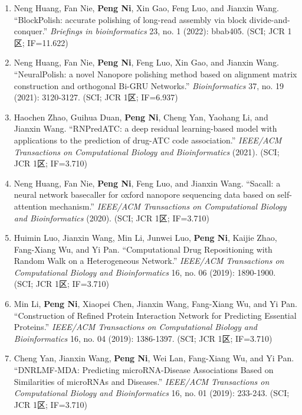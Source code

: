 \documentclass[zh]{resume}
\begin{document}
\begin{itemize}
\begin{enumerate}
    \item Neng Huang, Fan Nie, \textbf{Peng Ni}, Xin Gao, Feng Luo, and Jianxin Wang. \enquote{BlockPolish: accurate polishing of long-read assembly via block divide-and-conquer.} {\it Briefings in bioinformatics} 23, no. 1 (2022): bbab405. (SCI; JCR 1区; IF=11.622)
    \item Neng Huang, Fan Nie, \textbf{Peng Ni}, Feng Luo, Xin Gao, and Jianxin Wang. \enquote{NeuralPolish: a novel Nanopore polishing method based on alignment matrix construction and orthogonal Bi-GRU Networks.} {\it Bioinformatics} 37, no. 19 (2021): 3120-3127. (SCI; JCR 1区; IF=6.937)
    \item Haochen Zhao, Guihua Duan, \textbf{Peng Ni}, Cheng Yan, Yaohang Li, and Jianxin Wang. \enquote{RNPredATC: a deep residual learning-based model with applications to the prediction of drug-ATC code association.} {\it IEEE/ACM Transactions on Computational Biology and Bioinformatics} (2021). (SCI; JCR 1区; IF=3.710)
    \item Neng Huang, Fan Nie, \textbf{Peng Ni}, Feng Luo, and Jianxin Wang. \enquote{Sacall: a neural network basecaller for oxford nanopore sequencing data based on self-attention mechanism.} {\it IEEE/ACM Transactions on Computational Biology and Bioinformatics} (2020). (SCI; JCR 1区; IF=3.710)
    \item Huimin Luo, Jianxin Wang, Min Li, Junwei Luo, \textbf{Peng Ni}, Kaijie Zhao, Fang-Xiang Wu, and Yi Pan. \enquote{Computational Drug Repositioning with Random Walk on a Heterogeneous Network.} {\it IEEE/ACM Transactions on Computational Biology and Bioinformatics} 16, no. 06 (2019): 1890-1900. (SCI; JCR 1区; IF=3.710)
    \item Min Li, \textbf{Peng Ni}, Xiaopei Chen, Jianxin Wang, Fang-Xiang Wu, and Yi Pan. \enquote{Construction of Refined Protein Interaction Network for Predicting Essential Proteins.} {\it IEEE/ACM Transactions on Computational Biology and Bioinformatics} 16, no. 04 (2019): 1386-1397. (SCI; JCR 1区; IF=3.710)
    \item Cheng Yan, Jianxin Wang, \textbf{Peng Ni}, Wei Lan, Fang-Xiang Wu, and Yi Pan. \enquote{DNRLMF-MDA: Predicting microRNA-Disease Associations Based on Similarities of microRNAs and Diseases.} {\it IEEE/ACM Transactions on Computational Biology and Bioinformatics} 16, no. 01 (2019): 233-243. (SCI; JCR 1区; IF=3.710)
  \end{enumerate}
\end{itemize}

\end{document}
